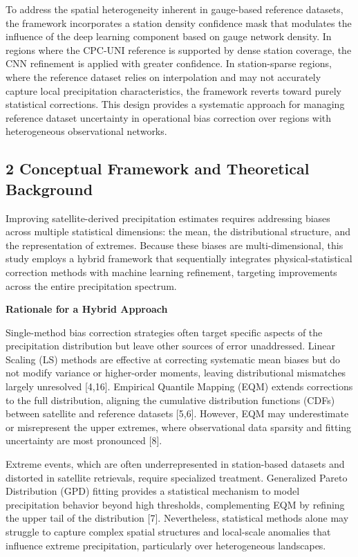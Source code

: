 \documentclass[
]{article}
\begin{document}
To address the spatial heterogeneity inherent in gauge-based reference
datasets, the framework incorporates a station density confidence mask
that modulates the influence of the deep learning component based on
gauge network density. In regions where the CPC-UNI reference is
supported by dense station coverage, the CNN refinement is applied with
greater confidence. In station-sparse regions, where the reference
dataset relies on interpolation and may not accurately capture local
precipitation characteristics, the framework reverts toward purely
statistical corrections. This design provides a systematic approach for
managing reference dataset uncertainty in operational bias correction
over regions with heterogeneous observational networks.

\subsection{2 Conceptual Framework and Theoretical
Background}\label{conceptual-framework-and-theoretical-background}

Improving satellite-derived precipitation estimates requires addressing
biases across multiple statistical dimensions: the mean, the
distributional structure, and the representation of extremes. Because
these biases are multi-dimensional, this study employs a hybrid
framework that sequentially integrates physical-statistical correction
methods with machine learning refinement, targeting improvements across
the entire precipitation spectrum.

\textbf{Rationale for a Hybrid Approach}

Single-method bias correction strategies often target specific aspects
of the precipitation distribution but leave other sources of error
unaddressed. Linear Scaling (LS) methods are effective at correcting
systematic mean biases but do not modify variance or higher-order
moments, leaving distributional mismatches largely unresolved
{[}4,16{]}. Empirical Quantile Mapping (EQM) extends corrections to the
full distribution, aligning the cumulative distribution functions (CDFs)
between satellite and reference datasets {[}5,6{]}. However, EQM may
underestimate or misrepresent the upper extremes, where observational
data sparsity and fitting uncertainty are most pronounced {[}8{]}.

Extreme events, which are often underrepresented in station-based
datasets and distorted in satellite retrievals, require specialized
treatment. Generalized Pareto Distribution (GPD) fitting provides a
statistical mechanism to model precipitation behavior beyond high
thresholds, complementing EQM by refining the upper tail of the
distribution {[}7{]}. Nevertheless, statistical methods alone may
struggle to capture complex spatial structures and local-scale anomalies
that influence extreme precipitation, particularly over heterogeneous
landscapes.
\end{document}
